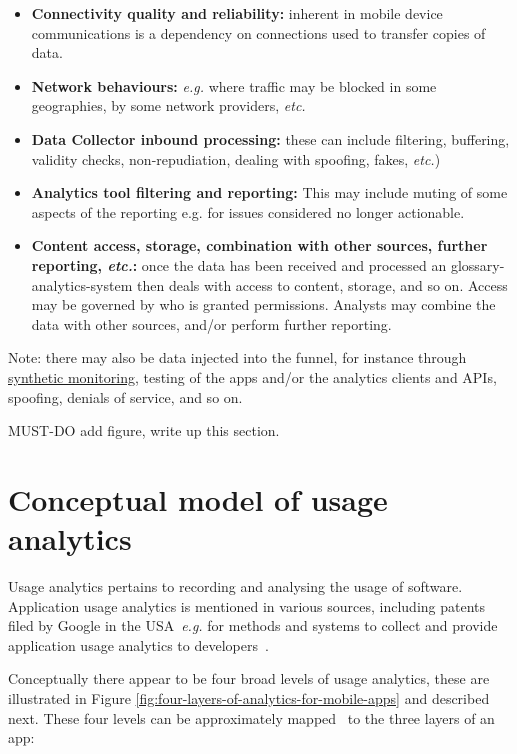 \begin{itemize}
    \item \textbf{Connectivity quality and reliability:} inherent in mobile device communications is a dependency on connections used to transfer copies of data. 
    \item \textbf{Network behaviours:} \emph{e.g.} where traffic may be blocked in some geographies, by some network providers, \emph{etc.}~
    \item \textbf{Data Collector inbound processing:} these can include filtering, buffering, validity checks, non-repudiation, dealing with spoofing, fakes, \emph{etc.})
    \item \textbf{Analytics tool filtering and reporting:} This may include muting of some aspects of the reporting e.g. for issues considered no longer actionable. 
    \item \textbf{Content access, storage, combination with other sources, further reporting, \emph{etc.}:} once the data has been received and processed an \gls{glossary-analytics-system} then deals with access to content, storage, and so on. Access may be governed by who is granted permissions. Analysts may combine the data with other sources, and/or perform further reporting.
\end{itemize}

Note: there may also be data injected into the funnel, for instance through \href{https://en.wikipedia.org/wiki/Synthetic_monitoring}{synthetic monitoring}, testing of the apps and/or the analytics clients and APIs, spoofing, denials of service, and so on. 

MUST-DO add figure, write up this section.




\section{Conceptual model of usage analytics}
Usage analytics pertains to recording and analysing the usage of software. Application usage analytics is mentioned in various sources, including patents filed by Google in the USA~\emph{e.g.} for methods and systems to collect and provide application usage analytics to developers~. 

Conceptually there appear to be four broad levels of usage analytics, these are illustrated in Figure \ref{fig:four-layers-of-analytics-for-mobile-apps} and described next. These four levels can be approximately mapped~ to the three layers of an app:

